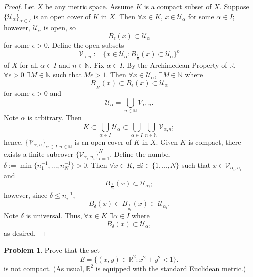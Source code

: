 \documentclass{amsart}
\theoremstyle{definition}
\newtheorem{problem}{Problem}
\begin{document}
\begin{proof}
    Let $X$ be any metric space. Assume $K$ is a compact subset of $X$. Suppose $\{\mathcal{U}_{\alpha}\}_{\alpha \in I}$ is an open cover of $K$ in $X$. Then $\forall x \in K$, $x \in \mathcal{U}_{\alpha}$ for some $\alpha \in I$; however, $\mathcal{U}_{\alpha}$ is open, so 
    \[
    B_{\epsilon}(x) \subset \mathcal{U}_{\alpha}
    \]
    for some $\epsilon > 0$. Define the open subsets
    \[
    \mathcal{V}_{\alpha,n} := \{x \in \mathcal{U}_{\alpha} : B_{\frac{1}{n}}(x) \subset \mathcal{U}_{\alpha}\}^{\mathrm{o}}
    \]
    of $X$ for all $\alpha \in I$ and $n \in \mathbb{N}$. Fix $\alpha \in I$. By the Archimedean Property of $\mathbb{R}$, $\forall \epsilon > 0$ $\exists M \in \mathbb{N}$ such that $M\epsilon > 1$. Then $\forall x \in \mathcal{U}_{\alpha}$, $\exists M \in \mathbb{N}$ where
    \[
    B_{\frac{1}{M}}(x) \subset B_{\epsilon}(x) \subset \mathcal{U}_{\alpha}
    \]
    for some $\epsilon > 0$ and
    \[
    \mathcal{U}_{\alpha} = \bigcup_{n \in \mathbb{N}}\mathcal{V}_{\alpha,n}.
    \]
    Note $\alpha$ is arbitrary. Then
    \[
    K \subset \bigcup_{\alpha \in I}\mathcal{U}_{\alpha} \subset \bigcup_{\alpha \in I}\bigcup_{n \in \mathbb{N}}\mathcal{V}_{\alpha,n};
    \]
    hence, $\{\mathcal{V}_{\alpha,n}\}_{\alpha \in I, n \in \mathbb{N}}$ is an open cover of $K$ in $X$. Given $K$ is compact, there exists a finite subcover $\{\mathcal{V}_{\alpha_i,n_i}\}_{i = 1}^{N}$. Define the number $\delta := \min\{n_1^{-1},...,n_N^{-1}\} > 0$. Then $\forall x \in K$, $\exists i \in \{1,...,N\}$ such that $x \in \mathcal{V}_{\alpha_i,n_i}$ and
    \[
    B_{\frac{1}{n_i}}(x) \subset \mathcal{U}_{\alpha_i};
    \]
    however, since $\delta \leq n_i^{-1}$,
    \[
    B_{\delta}(x) \subset B_{\frac{1}{n_i}}(x) \subset \mathcal{U}_{\alpha_i}.
    \]
    Note $\delta$ is universal. Thus, $\forall x \in K$ $\exists \alpha \in I$ where
    \[
    B_{\delta}(x) \subset \mathcal{U}_{\alpha},
    \]
    as desired.
\end{proof}

\begin{problem}
    Prove that the set 
    \[
    E = \{(x,y) \in \mathbb{R}^2 : x^2+y^2 <1\}. 
    \]
    is not compact. (As usual, $\mathbb{R}^2$ is equipped with the standard Euclidean metric.)
\end{problem}
\end{document}
